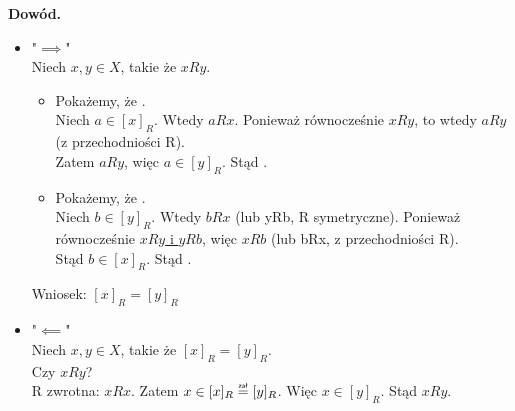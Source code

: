 \documentclass[a5paper,8pt]{article}
\theoremstyle{mythmstyle}
\newcommand\ass{\mathrel{\overset{\makebox[0pt]{\mbox{\normalfont\tiny\sffamily zał}}}{=}}}
\begin{document}
            \textbf{Dowód.}
            \begin{itemize}
                \item "$ \implies $"\\
                    Niech $ x, y \in X $, takie że $ x R y $.

                    \begin{itemize}
                        \item Pokażemy, że . \\
                            Niech $ a \in [x]_R $. Wtedy \underline{$ a R x $}. Ponieważ równocześnie \underline{$ x R y $},
                            to wtedy \underline{$ a R y $} (z przechodniości R). \\
                            Zatem $ a R y $, więc $ a \in [y]_R $.
                            Stąd .

                        \item Pokażemy, że . \\
                            Niech $ b \in [y]_R $. Wtedy \underline{$ b R x $} (lub yRb, R symetryczne).
                            Ponieważ równocześnie \underline{$ x R y $ i $ y R b $},
                            więc \underline{$ x R b $} (lub bRx, z przechodniości R). \\
                            Stąd $ b \in [x]_R $.
                            Stąd .

                    \end{itemize}

                    Wniosek: $ [x]_R = [y]_R $

                \item "$ \impliedby $"\\
                    Niech $ x, y \in X $, takie że $ [x]_R = [y]_R $.\\
                    Czy $ x R y $?\\

                    R zwrotna: $ x R x $. Zatem $ x \in [x]_R \ass [y]_R $. Więc $ x \in [y]_R $.
                    Stąd $ x R y $.
            \end{itemize}
            \pagebreak
            
\end{document}

